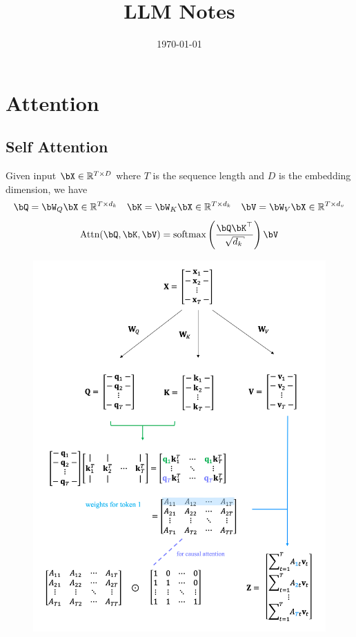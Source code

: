 \documentclass{article}
\begin{document}
\title{LLM Notes}

\date{\today}                       
\maketitle
\tableofcontents
\clearpage


\section{Attention}
\subsection{Self Attention}
Given input $\bX \in \reals^{T \times D}$ where $T$ is the sequence length and $D$ is the embedding dimension, we have
\[
\bQ = \bW_Q \bX \in \reals^{T \times d_k} \quad \bK= \bW_K \bX \in \reals^{T \times d_k} \quad \bV = \bW_V \bX \in \reals^{T \times d_v}
\]
\[
\text{Attn}(\bQ, \bK, \bV) = \text{softmax} \left(\frac{\bQ \bK^\top}{\sqrt{d_k}} \right) \bV
\]

\begin{figure}[h]
\centering
\includegraphics[scale=0.35]{imgs/self-attention.png}
\end{figure}
\end{document}
